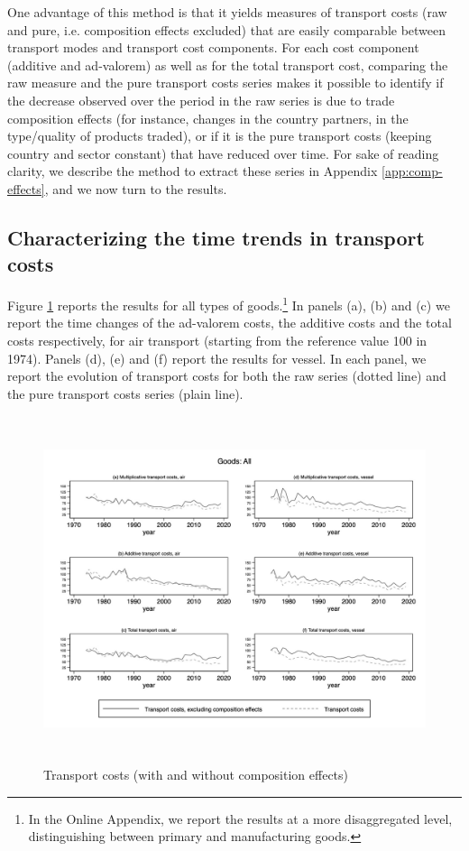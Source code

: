 \documentclass[a4paper,11pt]{article}
\begin{document}
One advantage of this method is that it yields measures of transport costs (raw and pure, i.e. composition effects excluded) that are easily comparable between transport modes and transport cost components.
For each cost component (additive and ad-valorem) as well as for the total transport cost, comparing the raw measure and the pure transport costs series makes it possible to identify if the decrease observed over the period in the raw series is due to trade composition effects (for instance, changes in the country partners, in the type/quality of products traded), or if it is the pure transport costs (keeping country and sector constant) that have reduced over time. For sake of reading clarity, we describe the method to extract these series in Appendix \ref{app:comp-effects}, and we now turn to the results.



\subsection{Characterizing the time trends in transport costs}
Figure \ref{fig:totalTC_compeffects_excl} reports the results for all types of goods.\footnote{In the Online Appendix, we report the results at a more disaggregated level, distinguishing between primary and manufacturing goods.} In panels (a), (b) and (c) we report the time changes of the ad-valorem costs, the additive costs and the total costs respectively, for air transport (starting from the reference value 100 in 1974).
Panels (d), (e) and (f) report the results for vessel.
In each panel, we report the evolution of transport costs for both the raw series (dotted line) and the pure transport costs series (plain line).


\begin{figure}[htbp]
\caption{Transport costs (with and without composition effects)}
\label{fig:totalTC_compeffects_excl}
\begin{center}
\includegraphics[height=4in]
{graph_composition_all.jpg}
\end{center}
\end{figure}
\end{document}
